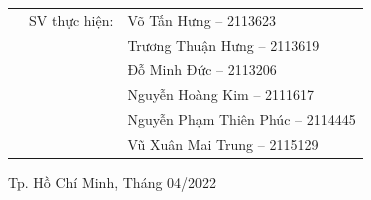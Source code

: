 \documentclass[a4paper]{article}
\theoremstyle{definition}
\begin{document}
\begin{titlepage}
\begin{table}[h]
\begin{tabular}{rrl}
& SV thực hiện: & Võ Tấn Hưng -- 2113623 \\
& & Trương Thuận Hưng -- 2113619 \\
& & Đỗ Minh Đức -- 2113206 \\
& & Nguyễn Hoàng Kim -- 2111617 \\
& & Nguyễn Phạm Thiên Phúc -- 2114445 \\
& & Vũ Xuân Mai Trung -- 2115129 \\
\end{tabular}
\end{table}
\vspace{1.5cm}
\begin{center}
{\footnotesize Tp. Hồ Chí Minh, Tháng 04/2022}
\end{center}
\end{titlepage}
\pagebreak
\end{document}
